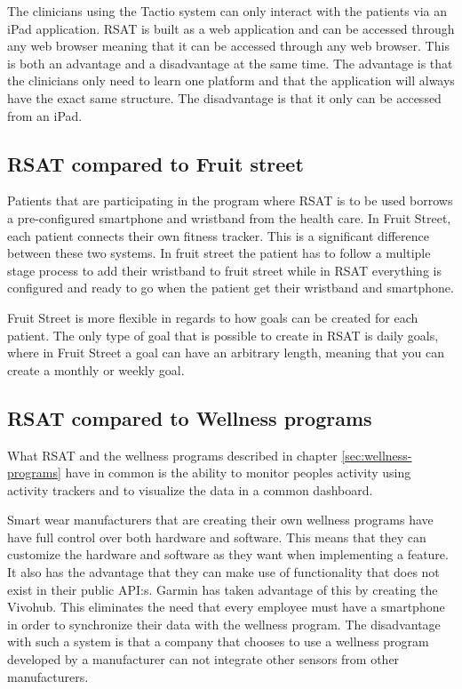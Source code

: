 \documentclass{cslthse-msc}
\begin{document}
The  clinicians using the Tactio system can only interact with the patients via an iPad application. RSAT is built as a web application and can be accessed through any web browser meaning that it can be accessed through any web browser. This is both an advantage and a disadvantage at the same time. The advantage is that the clinicians only need to learn one platform and that the application will always have the exact same structure. The disadvantage is that it only can be accessed from an iPad.


\subsection{RSAT compared to Fruit street}

Patients that are participating in the program where RSAT is to be used borrows a pre-configured smartphone and wristband from the health care. In Fruit Street, each patient connects their own fitness tracker. This is a significant difference between these two systems. In fruit street the patient has to follow a multiple stage process to add their wristband to fruit street  while in RSAT everything is configured and ready to go when the patient get their wristband and smartphone. 

Fruit Street is more flexible in regards to how goals can be created for each patient. The only type of goal that is possible to create in RSAT is daily goals, where in Fruit Street a goal can have an arbitrary length, meaning that you can create a monthly or weekly goal. 


\subsection{RSAT compared to Wellness programs}
What RSAT and the wellness programs described in chapter \ref{sec:wellness-programs} have in common is the ability to monitor peoples activity using activity trackers and to visualize the data in a common dashboard. 

Smart wear manufacturers that are creating their own wellness programs have have full control over both hardware and software. This means that they can customize the hardware and software as they want when implementing a feature. It also has the advantage that they can make use of functionality that does not exist in their public API:s. Garmin has taken advantage of this by creating the Vivohub. This eliminates the need that every employee must have a smartphone in order to synchronize their data with the wellness program. The disadvantage with such a system is that a company that chooses to use a wellness program developed by a manufacturer can not integrate other sensors from other manufacturers. 
\end{document}
